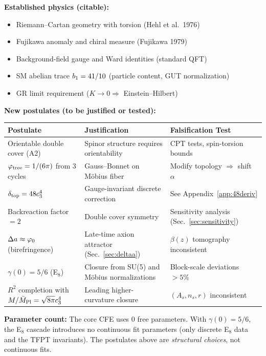 \vspace{0.5em}
\begin{tcolorbox}[colback=yellow!5, colframe=yellow!60!black, 
    title={\textbf{Assumption Ledger: Established vs.\ New}}, fonttitle=\bfseries]

\textbf{Established physics (citable):}
\begin{itemize}[leftmargin=1.5em, topsep=2pt, itemsep=1pt]
    \item Riemann--Cartan geometry with torsion (Hehl et al.~1976)
    \item Fujikawa anomaly and chiral measure (Fujikawa 1979)
    \item Background-field gauge and Ward identities (standard QFT)
    \item SM abelian trace $b_1 = 41/10$ (particle content, GUT normalization)
    \item GR limit requirement ($K \to 0 \Rightarrow$ Einstein--Hilbert)
\end{itemize}

\textbf{New postulates (to be justified or tested):}
\begin{center}
\begin{tabular}{@{}p{4cm}p{4cm}p{4.5cm}@{}}
\toprule
\textbf{Postulate} & \textbf{Justification} & \textbf{Falsification Test}\\
\midrule
Orientable double cover (A2) & Spinor structure requires orientability & CPT tests, spin-torsion bounds\\
$\varphi_{\mathrm{tree}} = 1/(6\pi)$ from 3 cycles & Gauss--Bonnet on M\"obius fiber & Modify topology $\Rightarrow$ shift $\alpha$\\
$\delta_{\mathrm{top}} = 48c_3^4$ & Gauge-invariant discrete correction & See Appendix~\ref{app:48deriv}\\
Backreaction factor $=2$ & Double cover symmetry & Sensitivity analysis (Sec.~\ref{sec:sensitivity})\\
$\Delta a \approx \varphi_0$ (birefringence) & Late-time axion attractor (Sec.~\ref{sec:deltaa}) & $\beta(z)$ tomography inconsistent\\
$\gamma(0) = 5/6$ (E$_8$) & Closure from SU(5) and M\"obius normalizations & Block-scale deviations $>5\%$\\
$R^2$ completion with $M/\bar{M}_{\mathrm{Pl}}=\sqrt{8\pi}c_3^4$ & Leading higher-curvature closure & $(A_s,n_s,r)$ inconsistent\\
\bottomrule
\end{tabular}
\end{center}

\textbf{Parameter count:} The core CFE uses 0 free parameters. With $\gamma(0)=5/6$, the E$_8$ cascade 
introduces no continuous fit parameters (only discrete E$_8$ data and the TFPT invariants). 
The postulates above are \emph{structural choices}, not continuous fits.
\end{tcolorbox}

